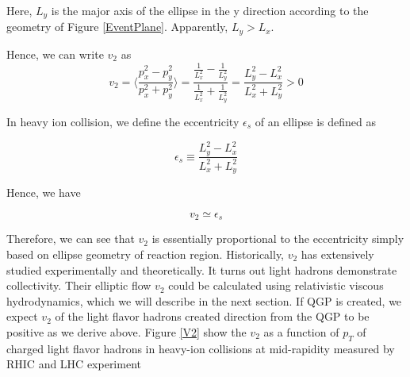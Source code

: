 Here,  $L_y$ is the major axis of the ellipse in the y direction according to the geometry of Figure \ref{EventPlane}. Apparently, $L_y > L_x$. 

Hence, we can write $v_2$ as 
\begin{equation}
v_2 =  \langle \frac{p_x^2 - p_y^2}{p_x^2 + p_y^2} \rangle = \frac{\frac{1}{L_x^2} - \frac{1}{L_y^2}}{\frac{1}{L_x^2} + \frac{1}{L_y^2}} =  \frac{L_y^2 - L_x^2}{L_x^2 + L_y^2}  > 0
\end{equation}

In heavy ion collision, we define the eccentricity $\epsilon_s$ of an ellipse is defined as \cite{V2Eccent}

\begin{equation}
\epsilon_s \equiv \frac{L_y^2 - L_x^2}{L_x^2 + L_y^2}
\end{equation}

Hence, we have

\begin{equation}
v_2 \simeq \epsilon_s
\end{equation}

Therefore, we can see that $v_2$ is essentially proportional to the eccentricity simply based on ellipse geometry of reaction region. Historically, $v_2$ has extensively studied experimentally and theoretically. It turns out light hadrons demonstrate collectivity. Their elliptic flow $v_2$ could be calculated using relativistic viscous hydrodynamics, which we will describe in the next section. If QGP is created, we expect $v_2$ of the light flavor hadrons created direction from the QGP to be positive as we derive above. Figure \ref{V2} show the $v_2$ as a function of $p_T$ of charged light flavor hadrons in heavy-ion collisions at mid-rapidity measured by RHIC and LHC experiment \cite{V2STAR,V2ALICE}

